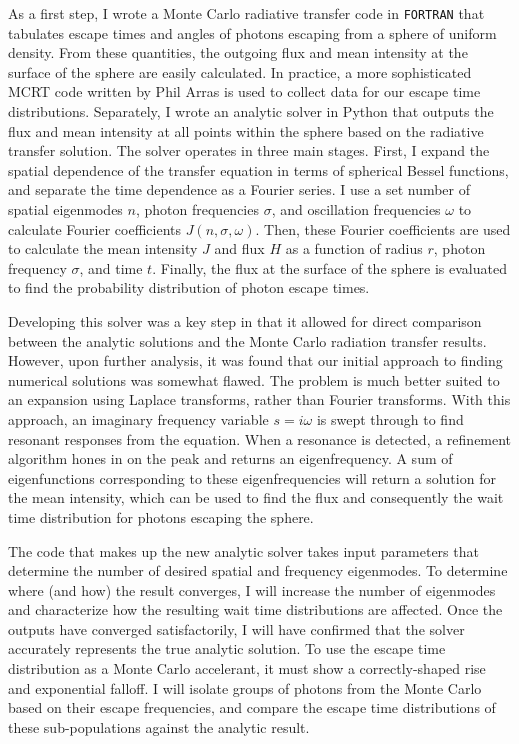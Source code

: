 \documentclass[onecolumn]{aastex63}
\begin{document}
As a first step, I wrote a Monte Carlo radiative transfer code in \texttt{FORTRAN} that tabulates escape times and angles of photons escaping from a sphere of uniform density. From these quantities, the outgoing flux and mean intensity at the surface of the sphere are easily calculated. In practice, a more sophisticated MCRT code written by Phil Arras is used to collect data for our escape time distributions. Separately, I wrote an analytic solver in Python that outputs the flux and mean intensity at all points within the sphere based on the radiative transfer solution. The solver operates in three main stages. First, I expand the spatial dependence of the transfer equation in terms of spherical Bessel functions, and separate the time dependence as a Fourier series. I use a set number of spatial eigenmodes $n$, photon frequencies $\sigma$, and oscillation frequencies $\omega$ to calculate Fourier coefficients $J(n, \sigma, \omega)$. Then, these Fourier coefficients are used to calculate the mean intensity $J$ and flux $H$ as a function of radius $r$, photon frequency $\sigma$, and time $t$. Finally, the flux at the surface of the sphere is evaluated to find the probability distribution of photon escape times.

Developing this solver was a key step in that it allowed for direct comparison between the analytic solutions and the Monte Carlo radiation transfer results. However, upon further analysis, it was found that our initial approach to finding numerical solutions was somewhat flawed. The problem is much better suited to an expansion using Laplace transforms, rather than Fourier transforms. With this approach, an imaginary frequency variable $s = i\omega$ is swept through to find resonant responses from the equation. When a resonance is detected, a refinement algorithm hones in on the peak and returns an eigenfrequency. A sum of eigenfunctions corresponding to these eigenfrequencies will return a solution for the mean intensity, which can be used to find the flux and consequently the wait time distribution for photons escaping the sphere.

The code that makes up the new analytic solver takes input parameters that determine the number of desired spatial and frequency eigenmodes. To determine where (and how) the result converges, I will increase the number of eigenmodes and characterize how the resulting wait time distributions are affected. Once the outputs have converged satisfactorily, I will have confirmed that the solver accurately represents the true analytic solution. To use the escape time distribution as a Monte Carlo accelerant, it must show a correctly-shaped rise and exponential falloff. I will isolate groups of photons from the Monte Carlo based on their escape frequencies, and compare the escape time distributions of these sub-populations against the analytic result.
\end{document}
